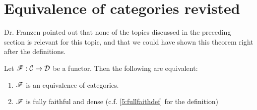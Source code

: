 \section{Equivalence of categories revisted}
\coms Dr. Franzen pointed out that none of the topics discussed in the preceding section is relevant for this topic, and that we could have shown this theorem right after the definitions.\come
\begin{thm}
Let $\mathscr{F}:\mathcal{C} \to \mathcal{D}$ be a functor. Then the following are equivalent:
\begin{enumerate}
    \item $\mathscr{F}$ is an equivalence of categories.
    \item $\mathscr{F}$ is fully faithful and dense (c.f. \cref{5:fullfaithdef} for the definition)
\end{enumerate}
\end{thm}
